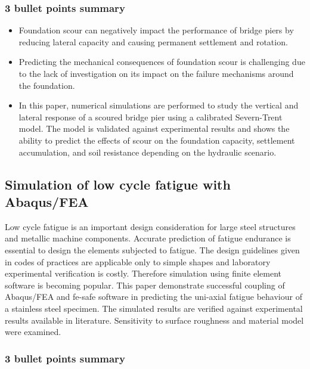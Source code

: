 \documentclass[
  letterpaper,
  DIV=11,
  numbers=noendperiod]{scrreprt}
\providecommand{\tightlist}{%
  \setlength{\itemsep}{0pt}\setlength{\parskip}{0pt}}\usepackage{longtable,booktabs,array}
\begin{document}
\hypertarget{bullet-points-summary-6}{%
\subsubsection{3 bullet points summary}\label{bullet-points-summary-6}}

\begin{itemize}
\tightlist
\item
  Foundation scour can negatively impact the performance of bridge piers
  by reducing lateral capacity and causing permanent settlement and
  rotation.
\item
  Predicting the mechanical consequences of foundation scour is
  challenging due to the lack of investigation on its impact on the
  failure mechanisms around the foundation.
\item
  In this paper, numerical simulations are performed to study the
  vertical and lateral response of a scoured bridge pier using a
  calibrated Severn-Trent model. The model is validated against
  experimental results and shows the ability to predict the effects of
  scour on the foundation capacity, settlement accumulation, and soil
  resistance depending on the hydraulic scenario.
\end{itemize}

\hypertarget{simulation-of-low-cycle-fatigue-with-abaqusfea-1}{%
\subsection{Simulation of low cycle fatigue with
Abaqus/FEA}\label{simulation-of-low-cycle-fatigue-with-abaqusfea-1}}

Low cycle fatigue is an important design consideration for large steel
structures and metallic machine components. Accurate prediction of
fatigue endurance is essential to design the elements subjected to
fatigue. The design guidelines given in codes of practices are
applicable only to simple shapes and laboratory experimental
verification is costly. Therefore simulation using finite element
software is becoming popular. This paper demonstrate successful coupling
of Abaqus/FEA and fe-safe software in predicting the uni-axial fatigue
behaviour of a stainless steel specimen. The simulated results are
verified against experimental results available in literature.
Sensitivity to surface roughness and material model were examined.

\hypertarget{bullet-points-summary-7}{%
\subsubsection{3 bullet points summary}\label{bullet-points-summary-7}}
\end{document}

